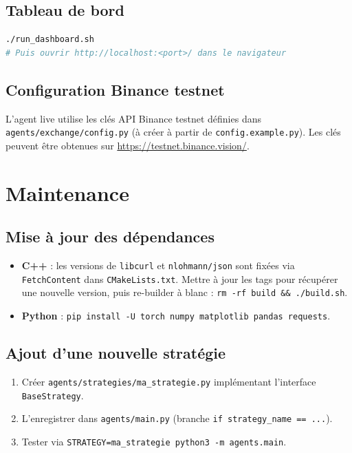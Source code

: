 \documentclass[11pt,a4paper]{article}
\begin{document}
\subsection{Tableau de bord}

\begin{lstlisting}[language=bash]
./run_dashboard.sh
# Puis ouvrir http://localhost:<port>/ dans le navigateur
\end{lstlisting}

\subsection{Configuration Binance testnet}

L'agent live utilise les clés API Binance testnet
définies dans \texttt{agents/exchange/config.py}
(à créer à partir de \texttt{config.example.py}).
Les clés peuvent être obtenues sur
\url{https://testnet.binance.vision/}.

\section{Maintenance}
\label{sec:maintenance}

\subsection{Mise à jour des dépendances}

\begin{itemize}[leftmargin=1.2cm]
    \item \textbf{C++} : les versions de \texttt{libcurl}
          et \texttt{nlohmann/json} sont fixées via
          \texttt{FetchContent} dans \texttt{CMakeLists.txt}.
          Mettre à jour les tags pour récupérer une nouvelle
          version, puis re-builder à blanc :
          \texttt{rm -rf build \&\& ./build.sh}.
    \item \textbf{Python} : \texttt{pip install -U torch
          numpy matplotlib pandas requests}.
\end{itemize}

\subsection{Ajout d'une nouvelle stratégie}

\begin{enumerate}[leftmargin=1.2cm]
    \item Créer \texttt{agents/strategies/ma\_strategie.py}
          implémentant l'interface \texttt{BaseStrategy}.
    \item L'enregistrer dans \texttt{agents/main.py}
          (branche \texttt{if strategy\_name == ...}).
    \item Tester via
          \texttt{STRATEGY=ma\_strategie python3 -m agents.main}.
\end{enumerate}
\end{document}
